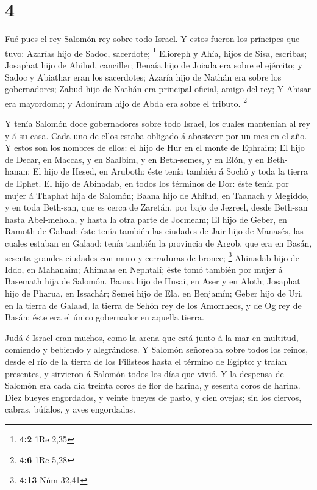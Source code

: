 \hypertarget{section-3}{%
\section{4}\label{section-3}}

 Fué pues el rey Salomón rey sobre todo Israel.
 Y estos fueron los príncipes que tuvo: Azarías hijo de
Sadoc, sacerdote; \footnote{\textbf{4:2} 1Re 2,35} 
Elioreph y Ahía, hijos de Sisa, escribas; Josaphat hijo de Ahilud,
canciller;  Benaía hijo de Joiada era sobre el ejército; y
Sadoc y Abiathar eran los sacerdotes;  Azaría hijo de
Nathán era sobre los gobernadores; Zabud hijo de Nathán era principal
oficial, amigo del rey;  Y Ahisar era mayordomo; y
Adoniram hijo de Abda era sobre el tributo. \footnote{\textbf{4:6} 1Re
  5,28}

 Y tenía Salomón doce gobernadores sobre todo Israel, los
cuales mantenían al rey y á su casa. Cada uno de ellos estaba obligado á
abastecer por un mes en el año.  Y estos son los nombres
de ellos: el hijo de Hur en el monte de Ephraim;  El hijo
de Decar, en Maccas, y en Saalbim, y en Beth-semes, y en Elón, y en
Beth-hanan;  El hijo de Hesed, en Aruboth; éste tenía
también á Sochô y toda la tierra de Ephet.  El hijo de
Abinadab, en todos los términos de Dor: éste tenía por mujer á Thaphat
hija de Salomón;  Baana hijo de Ahilud, en Taanach y
Megiddo, y en toda Beth-san, que es cerca de Zaretán, por bajo de
Jezreel, desde Beth-san hasta Abel-mehola, y hasta la otra parte de
Jocmeam;  El hijo de Geber, en Ramoth de Galaad; éste
tenía también las ciudades de Jair hijo de Manasés, las cuales estaban
en Galaad; tenía también la provincia de Argob, que era en Basán,
sesenta grandes ciudades con muro y cerraduras de bronce; \footnote{\textbf{4:13}
  Núm 32,41}  Ahinadab hijo de Iddo, en Mahanaim;
 Ahimaas en Nephtalí; éste tomó también por mujer á
Basemath hija de Salomón.  Baana hijo de Husai, en Aser y
en Aloth;  Josaphat hijo de Pharua, en Issachâr;
 Semei hijo de Ela, en Benjamín;  Geber
hijo de Uri, en la tierra de Galaad, la tierra de Sehón rey de los
Amorrheos, y de Og rey de Basán; éste era el único gobernador en aquella
tierra.

 Judá é Israel eran muchos, como la arena que está junto
á la mar en multitud, comiendo y bebiendo y alegrándose. 
Y Salomón señoreaba sobre todos los reinos, desde el río de la tierra de
los Filisteos hasta el término de Egipto: y traían presentes, y
sirvieron á Salomón todos los días que vivió.  Y la
despensa de Salomón era cada día treinta coros de flor de harina, y
sesenta coros de harina.  Diez bueyes engordados, y
veinte bueyes de pasto, y cien ovejas; sin los ciervos, cabras, búfalos,
y aves engordadas.

